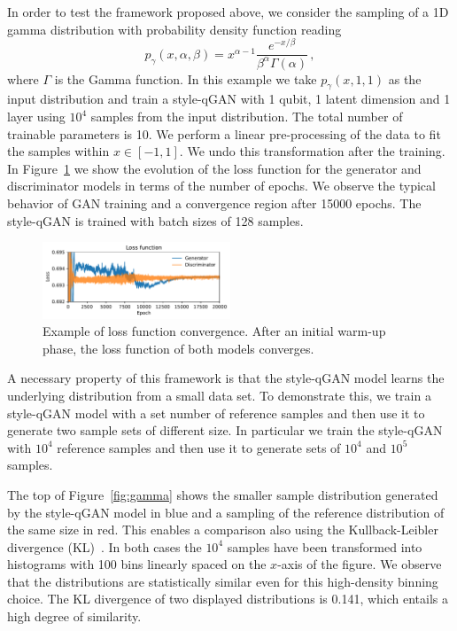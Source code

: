 \documentclass[twocolumn,preprintnumbers,superscriptaddress]{revtex4-2}
\begin{document}
In order to test the framework proposed above, we
consider the sampling of a 1D gamma distribution with probability density
function reading
\begin{equation}
  p_\gamma (x, \alpha, \beta) = x^{\alpha-1} \frac{e^{-x/\beta}}{\beta^\alpha \Gamma(\alpha)}\,,
\end{equation}
where $\Gamma$ is the Gamma function. In this example we take $p_\gamma (x, 1,
1)$ as the input distribution and train a style-qGAN with 1 qubit, 1 latent dimension and
1 layer using $10^4$ samples from the input distribution. The total number of trainable parameters is 10. We perform a linear pre-processing of the data to fit the samples within $x \in [-1, 1]$. We undo this transformation after the training.
%
In Figure~\ref{fig:loss} we show the evolution of the loss function for the
generator and discriminator models in terms of the number of epochs. We observe the
typical behavior of GAN training and a convergence region after 15000 epochs.
%
The style-qGAN is trained with batch sizes of 128 samples.

\begin{figure}
  \includegraphics[width=0.5\textwidth]{plots/1Dgamma/1Dgamma_loss.pdf}
  \caption{\label{fig:loss}Example of loss function convergence. After an
  initial warm-up phase, the loss function of both models converges.}
\end{figure}

A necessary property of this framework is that the style-qGAN model learns the underlying distribution from a small data set. To demonstrate this, we train a style-qGAN model with a set number of reference samples and then use it to generate two sample sets of different size. In particular we train the style-qGAN with $10^4$ reference samples and then use it to generate sets of $10^4$ and $10^5$ samples.

The top of Figure~\ref{fig:gamma} shows the smaller sample distribution generated by the style-qGAN model in blue and a sampling of the reference distribution of the same size in red. This enables a comparison also using the Kullback-Leibler divergence (KL)~\cite{kullback1951information}.
In both cases the $10^4$ samples have been transformed into histograms with 100 bins linearly spaced on the $x$-axis of the figure. We observe that the distributions are statistically similar even for this high-density binning choice. The KL divergence of two displayed distributions is 0.141, which entails a high degree of similarity. 
\end{document}
